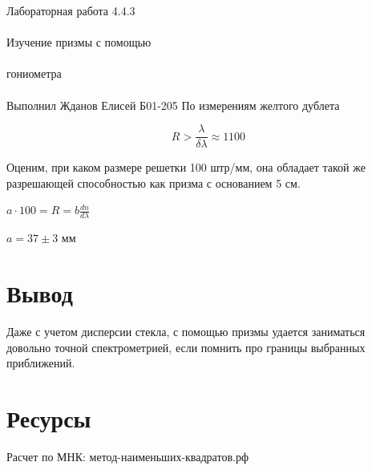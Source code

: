 \documentclass{astroedu-lab}
\begin{document}
\begin{problem}{\huge Лабораторная работа 4.4.3\\\\Изучение призмы с помощью\\\\гониометра\\\\Выполнил Жданов Елисей Б01-205}
По измерениям желтого дублета

\begin{equation}
	 R > \frac{\lambda}{\delta \lambda} \approx 1100
\end{equation}

Оценим, при каком размере решетки 100 штр/мм, она обладает такой же разрешающей способностью как призма с основанием 5 см.

$a \cdot 100 = R = b \frac{d n}{d \lambda}$

$a = 37 \pm 3$ мм


\section{Вывод}

Даже с учетом дисперсии стекла, с помощью призмы удается заниматься довольно точной спектрометрией, если помнить про границы выбранных приближений.


\section{Ресурсы}

Расчет по МНК: метод-наименьших-квадратов.рф


\end{problem}
\end{document}
